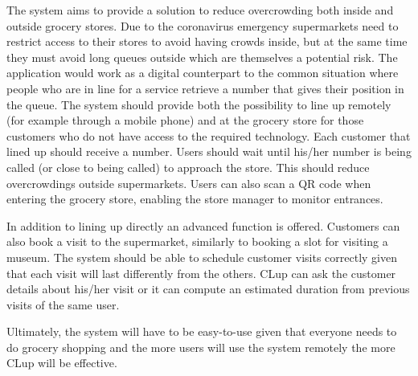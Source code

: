 The system aims to provide a solution to reduce overcrowding both inside and outside grocery stores.
Due to the coronavirus emergency supermarkets need to restrict access to their stores to avoid having crowds inside, but at the same time they must avoid long queues outside which are themselves a potential risk.
The application would work as a digital counterpart to the common situation where people who are in line for a service retrieve a number that gives their position in the queue.
The system should provide both the possibility to line up remotely (for example through a mobile phone) and at the grocery store for those customers who do not have access to the required technology.
Each customer that lined up should receive a number. Users should wait until his/her number is being called (or close to being called) to approach the store. This should reduce overcrowdings outside supermarkets.
Users can also scan a QR code when entering the grocery store, enabling the store manager to monitor entrances. 

In addition to lining up directly an advanced function is offered. Customers can also book a visit to the supermarket, similarly to booking a slot for visiting a museum. The system should be able to schedule customer visits correctly given that each visit will last differently from the others.  
CLup can ask the customer details about his/her visit or it can compute an estimated duration from previous visits of the same user.

Ultimately, the system will have to be easy-to-use given that everyone needs to do grocery shopping and the more users will use the system remotely the more CLup will be effective.

